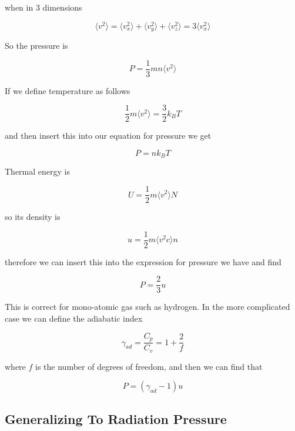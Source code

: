 when in 3 dimensions

\begin{equation}
	\langle v^2 \rangle = \langle v_x^2 \rangle + \langle v_y^2 \rangle + \langle v_z^2 \rangle = 3\langle v_x^2 \rangle
\end{equation}

So the pressure is

\begin{equation}
	P=\frac{1}{3}mn\langle v^2 \rangle
\end{equation}

If we define temperature as follows

\begin{equation}
	\frac{1}{2}m\langle v^2 \rangle = \frac{3}{2}k_BT
\end{equation}

and then insert this into our equation for pressure we get

\begin{equation}
	P=nk_BT
\end{equation}

Thermal energy is 

\begin{equation}
	U = \frac{1}{2}m\langle v^2 \rangle N
\end{equation}

so its density is

\begin{equation}
	u = \frac{1}{2}m\langle v^2c \rangle n
\end{equation}

therefore we can insert this into the expression for pressure we have and find

\begin{equation}
	P = \frac{2}{3}u
\end{equation}

This is correct for mono-atomic gas such as hydrogen. In the more complicated case we can define the adiabatic index 

\begin{equation}
	\gamma_{ad} = \frac{C_p}{C_v} = 1+\frac{2}{f}
\end{equation}

where $f$ is the number of degrees of freedom, and then we can find that

\begin{equation}
	P = (\gamma_{ad}-1)u
\end{equation}


\subsection{Generalizing To Radiation Pressure}

